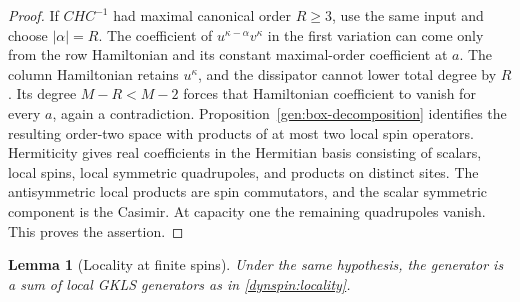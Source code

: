 \documentclass[reqno]{amsart}
\newtheorem{lemma}[theorem]{Lemma}
\theoremstyle{definition}
\theoremstyle{remark}
\begin{document}
\begin{proof}
If $CHC^{-1}$ had maximal canonical order $R\geq3$, use the same input
and choose $|\alpha|=R$.  The coefficient of
$u^{\kappa-\alpha}v^\kappa$ in the first variation can come only from
the row Hamiltonian and its constant maximal-order coefficient at $a$.
The column Hamiltonian retains $u^\kappa$, and the dissipator cannot
lower total degree by $R$.  Its degree $M-R<M-2$ forces that Hamiltonian
coefficient to vanish for every $a$, again a contradiction.
Proposition~\ref{gen:box-decomposition} identifies the resulting
order-two space with products of at most two local spin operators.
Hermiticity gives real coefficients in the Hermitian basis consisting
of scalars, local spins, local symmetric quadrupoles, and products on
distinct sites.  The antisymmetric local products are spin commutators,
and the scalar symmetric component is the Casimir.  At capacity one
the remaining quadrupoles vanish.  This proves the assertion.
\end{proof}

\begin{lemma}[Locality at finite spins]\label{dynspin:local}
Under the same hypothesis, the generator is a sum of local GKLS
generators as in \eqref{dynspin:locality}.
\end{lemma}
\end{document}
